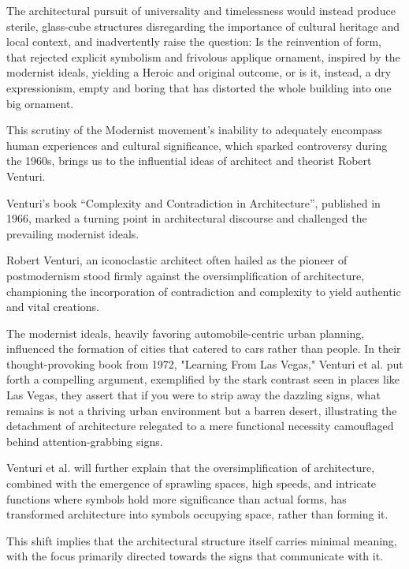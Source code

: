 The architectural pursuit of universality and timelessness would instead produce sterile, glass-cube structures\cite{Schudel2018} disregarding the importance of cultural heritage and local context, and inadvertently raise the question: Is the reinvention of form, that rejected explicit symbolism and frivolous applique ornament, inspired by the modernist ideals,  yielding a Heroic and original outcome, or is it, instead, a dry expressionism, empty and boring that has distorted the whole building into one big ornament\cite{Venturi1971}.

This scrutiny of the Modernist movement's inability to adequately encompass human experiences and cultural significance, which sparked controversy during the 1960s, brings us to the influential ideas of architect and theorist Robert Venturi.

Venturi's book ``Complexity and Contradiction in Architecture'', published in 1966, marked a turning point in architectural discourse and challenged the prevailing modernist ideals.

Robert Venturi, an iconoclastic architect often hailed as the pioneer of postmodernism\cite{Schudel2018} stood firmly against the oversimplification of architecture, championing the incorporation of contradiction and complexity to yield authentic and vital creations.

The modernist ideals, heavily favoring automobile-centric urban planning, influenced the formation of cities that catered to cars rather than people.
In their thought-provoking book from 1972, "Learning From Las Vegas," Venturi et al.\cite{Venturi1972} put forth a compelling argument, exemplified by the stark contrast seen in places like Las Vegas, they assert that if you were to strip away the dazzling signs, what remains is not a thriving urban environment but a barren desert, illustrating the detachment of architecture relegated to a mere functional necessity camouflaged behind attention-grabbing signs.

Venturi et al.\cite{Venturi1972} will further explain that the oversimplification of architecture, combined with the emergence of sprawling spaces, high speeds, and intricate functions where symbols hold more significance than actual forms, has transformed architecture into symbols occupying space, rather than forming it.

This shift implies that the architectural structure itself carries minimal meaning, with the focus primarily directed towards the signs that communicate with it.

